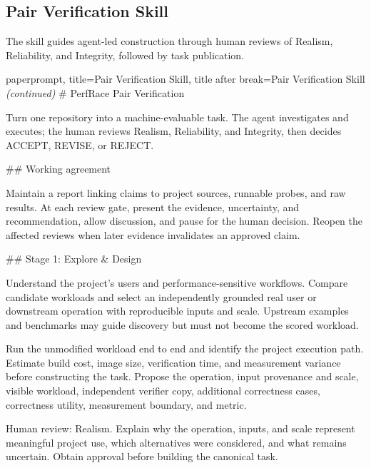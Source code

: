 \subsection{Pair Verification Skill}
\label{app:perfrace-pair-verification-skill}

The skill guides agent-led construction through human reviews of Realism,
Reliability, and Integrity, followed by task publication.

\begin{tcblisting}{paperprompt,
  title={Pair Verification Skill},
  title after break={Pair Verification Skill \normalfont\itshape (continued)}
}
# PerfRace Pair Verification

Turn one repository into a machine-evaluable task. The agent investigates and executes; the human reviews Realism, Reliability, and Integrity, then decides ACCEPT, REVISE, or REJECT.

## Working agreement

Maintain a report linking claims to project sources, runnable probes, and raw results. At each review gate, present the evidence, uncertainty, and recommendation, allow discussion, and pause for the human decision. Reopen the affected reviews when later evidence invalidates an approved claim.

## Stage 1: Explore & Design

Understand the project's users and performance-sensitive workflows. Compare candidate workloads and select an independently grounded real user or downstream operation with reproducible inputs and scale. Upstream examples and benchmarks may guide discovery but must not become the scored workload.

Run the unmodified workload end to end and identify the project execution path. Estimate build cost, image size, verification time, and measurement variance before constructing the task. Propose the operation, input provenance and scale, visible workload, independent verifier copy, additional correctness cases, correctness utility, measurement boundary, and metric.

Human review: Realism. Explain why the operation, inputs, and scale represent meaningful project use, which alternatives were considered, and what remains uncertain. Obtain approval before building the canonical task.


\end{tcblisting}
